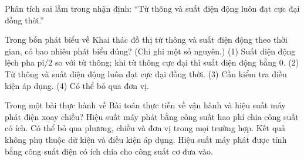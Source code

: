 \begin{bt}
Phân tích sai lầm trong nhận định: “Từ thông và suất điện động luôn đạt cực đại đồng thời.”
\end{bt}

\begin{ex}
Trong bốn phát biểu về Khai thác đồ thị từ thông và suất điện động theo thời gian, có bao nhiêu phát biểu đúng? (Chỉ ghi một số nguyên.) (1) Suất điện động lệch pha pi/2 so với từ thông; khi từ thông cực đại thì suất điện động bằng 0. (2) Từ thông và suất điện động luôn đạt cực đại đồng thời. (3) Cần kiểm tra điều kiện áp dụng. (4) Có thể bỏ qua đơn vị.
\end{ex}

\begin{ex}
Trong một bài thực hành về Bài toán thực tiễn về vận hành và hiệu suất máy phát điện xoay chiều?
\choice
{Hiệu suất máy phát bằng công suất hao phí chia công suất có ích.}
{Có thể bỏ qua phương, chiều và đơn vị trong mọi trường hợp.}
{Kết quả không phụ thuộc dữ kiện và điều kiện áp dụng.}
{\True Hiệu suất máy phát được tính bằng công suất điện có ích chia cho công suất cơ đưa vào.}
\end{ex}

